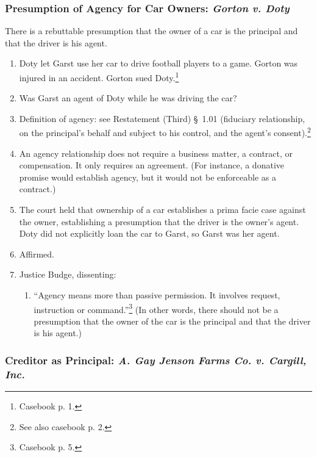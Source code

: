 \subsubsection{Presumption of Agency for Car Owners: \emph{Gorton v. Doty}}

There is a rebuttable presumption that the owner of a car is the principal and 
that the driver is his agent.

\begin{enumerate}
    \item Doty let Garst use her car to drive football players to a game. 
    Gorton was injured in an accident. Gorton sued Doty.\footnote{Casebook p. 
    1.}
    \item Was Garst an agent of Doty while he was driving the car?
    \item Definition of agency: see Restatement (Third) \S\ 1.01 (fiduciary 
    relationship, on the principal's behalf and subject to his control, and 
    the agent's consent).\footnote{See also casebook p. 2.}
    \item An agency relationship does not require a business matter, a 
    contract, or compensation. It only requires an agreement. (For instance, a 
    donative promise would establish agency, but it would not be enforceable 
    as a contract.)
    \item The court held that ownership of a car establishes a prima facie 
    case against the owner, establishing a presumption that the driver is the 
    owner's agent. Doty did not explicitly loan the car to Garst, so Garst was 
    her agent.
    \item Affirmed.
    \item Justice Budge, dissenting:
    \begin{enumerate}
        \item ``Agency means more than passive permission. It involves 
        request, instruction or command.''\footnote{Casebook p. 5.} (In other 
        words, there should not be a presumption that the owner of the car is 
        the principal and that the driver is his agent.)
    \end{enumerate}
\end{enumerate}

\subsubsection{Creditor as Principal: \emph{A. Gay Jenson Farms Co. v. 
Cargill, Inc.}}

